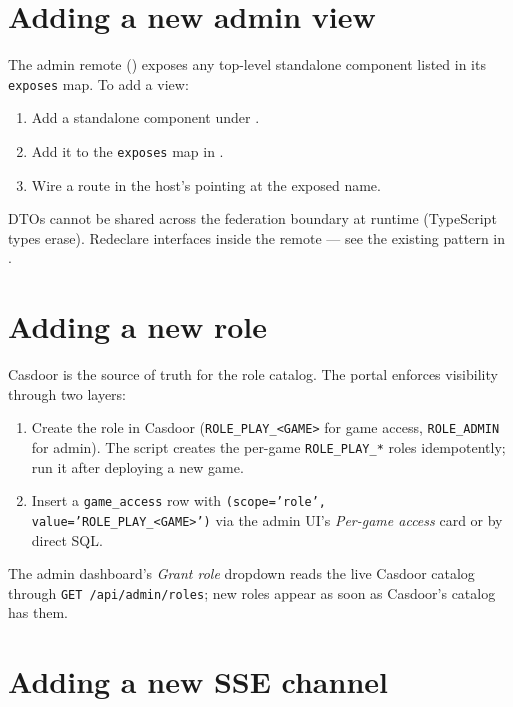 \section{Adding a new admin view}

The admin remote () exposes any
top-level standalone component listed in its \texttt{exposes} map. To
add a view:

\begin{enumerate}
  \item Add a standalone component under
        .
  \item Add it to the \texttt{exposes} map in
        .
  \item Wire a route in the host's
         pointing at the
        exposed name.
\end{enumerate}

DTOs cannot be shared across the federation boundary at runtime
(TypeScript types erase). Redeclare interfaces inside the remote — see
the existing pattern in
.

\section{Adding a new role}

Casdoor is the source of truth for the role catalog. The portal
enforces visibility through two layers:

\begin{enumerate}
  \item Create the role in Casdoor (\texttt{ROLE\_PLAY\_<GAME>} for game
        access, \texttt{ROLE\_ADMIN} for admin). The
         script creates the per-game
        \texttt{ROLE\_PLAY\_*} roles idempotently; run it after
        deploying a new game.
  \item Insert a \texttt{game\_access} row with
        \texttt{(scope='role', value='ROLE\_PLAY\_<GAME>')} via the
        admin UI's \emph{Per-game access} card or by direct SQL.
\end{enumerate}

The admin dashboard's \emph{Grant role} dropdown reads the live Casdoor
catalog through \texttt{GET /api/admin/roles}; new roles appear as soon
as Casdoor's catalog has them.

\section{Adding a new SSE channel}

